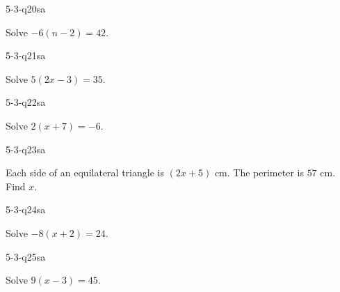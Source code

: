 \begin{practiceQuestion}{5-3-q20}{sa}
\begin{questionText}
Solve $-6(n - 2) = 42$.
\end{questionText}
\end{practiceQuestion}

\begin{practiceQuestion}{5-3-q21}{sa}
\begin{questionText}
Solve $5(2x - 3) = 35$.
\end{questionText}
\end{practiceQuestion}

\begin{practiceQuestion}{5-3-q22}{sa}
\begin{questionText}
Solve $2(x + 7) = -6$.
\end{questionText}
\end{practiceQuestion}

\begin{practiceQuestion}{5-3-q23}{sa}
\begin{questionText}
Each side of an equilateral triangle is $(2x + 5)$ cm. The perimeter is $57$ cm. Find $x$.
\end{questionText}
\end{practiceQuestion}

\begin{practiceQuestion}{5-3-q24}{sa}
\begin{questionText}
Solve $-8(x + 2) = 24$.
\end{questionText}
\end{practiceQuestion}

\begin{practiceQuestion}{5-3-q25}{sa}
\begin{questionText}
Solve $9(x - 3) = 45$.
\end{questionText}
\end{practiceQuestion}

